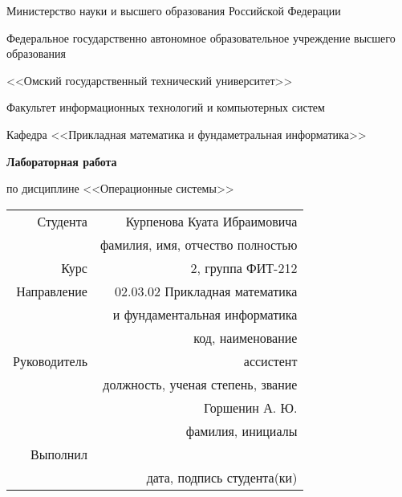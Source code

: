 \documentclass[14pt, a4paper]{article}
\begin{document}
    \thispagestyle{empty}

    \begin{center}
        Министерство науки и высшего образования Российской Федерации

        Федеральное государственно автономное образовательное учреждение высшего образования

        <<Омский государственный технический университет>>

        \vspace{1cm}
        Факультет информационных технологий и компьютерных систем

        Кафедра <<Прикладная математика и фундаметральная информатика>>

        \vspace{3cm}
        \textbf{Лабораторная работа}

        по дисциплине <<Операционные системы>>
    \end{center}
    
    \vspace{3cm}
    \begin{flushright}    
        \begin{tabular}{ r r }
            Студента & Курпенова Куата Ибраимовича \\
            \cline{2-2}
            & \tiny{фамилия, имя, отчество полностью} \\

            Курс & 2, группа ФИТ-212 \\
            \cline{2-2}
            Направление & 02.03.02 Прикладная математика \\
            \cline{2-2}
            & и фундаментальная информатика \\
            \cline{2-2}
            & \tiny{код, наименование} \\

            Руководитель & ассистент \\
            \cline{2-2}
            & \tiny{должность, ученая степень, звание} \\
            & Горшенин А. Ю. \\
            \cline{2-2}
            & \tiny{фамилия, инициалы} \\

            Выполнил & \\
            \cline{2-2}
            & \tiny{дата, подпись студента(ки)} \\
        \end{tabular}
    \end{flushright}
    
\end{document}
